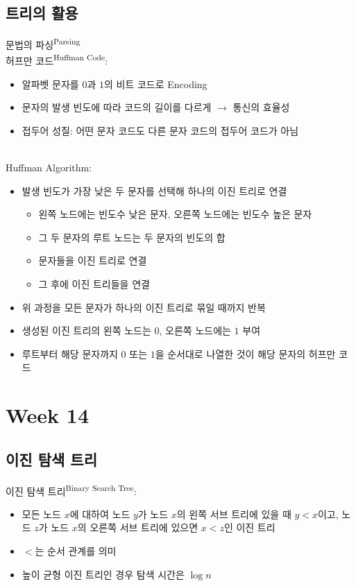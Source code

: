 \subsection{트리의 활용}
문법의 파싱\textsuperscript{Parsing}\\
허프만 코드\textsuperscript{Huffman Code}:
\begin{itemize}
    \item 알파벳 문자를 $0$과 $1$의 비트 코드로 Encoding
    \item 문자의 발생 빈도에 따라 코드의 길이를 다르게 $\to$ 통신의 효율성
    \item 접두어 성질: 어떤 문자 코드도 다른 문자 코드의 접두어 코드가 아님
\end{itemize}\phantom{}\\
Huffman Algorithm:
\begin{itemize}
    \item 발생 빈도가 가장 낮은 두 문자를 선택해 하나의 이진 트리로 연결
          \begin{itemize}
              \item 왼쪽 노드에는 빈도수 낮은 문자, 오른쪽 노드에는 빈도수 높은 문자
              \item 그 두 문자의 루트 노드는 두 문자의 빈도의 합
              \item 문자들을 이진 트리로 연결
              \item 그 후에 이진 트리들을 연결
          \end{itemize}
    \item 위 과정을 모든 문자가 하나의 이진 트리로 묶일 때까지 반복
    \item 생성된 이진 트리의 왼쪽 노드는 $0$, 오른쪽 노드에는 $1$ 부여
    \item 루트부터 해당 문자까지 $0$ 또는 $1$을 순서대로 나열한 것이 해당 문자의 허프만 코드
\end{itemize}

\newpage
\section{Week 14}
\subsection{이진 탐색 트리}
이진 탐색 트리\textsuperscript{Binary Search Tree}:
\begin{itemize}
    \item 모든 노드 $x$에 대하여 노드 $y$가 노드 $x$의 왼쪽 서브 트리에 있을 때 $y < x$이고,
          노드 $z$가 노드 $x$의 오른쪽 서브 트리에 있으면 $x < z$인 이진 트리
    \item $<$는 순서 관계를 의미
    \item 높이 균형 이진 트리인 경우 탐색 시간은 $\log n$
\end{itemize}

